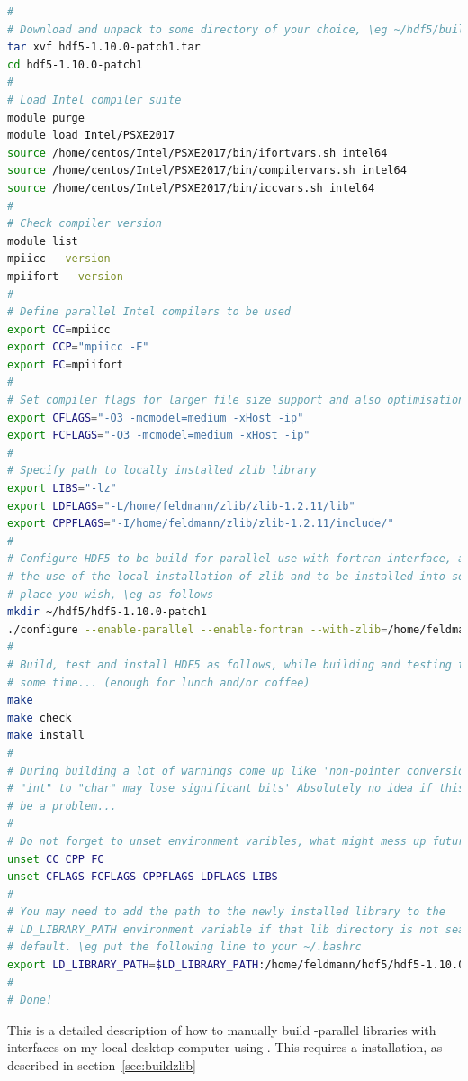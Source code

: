 \documentclass[a4paper, 11pt, DIV=11]{scrartcl}
\begin{document}
\begin{lstlisting}[language=bash]
# 
# Download and unpack to some directory of your choice, \eg ~/hdf5/build/.
tar xvf hdf5-1.10.0-patch1.tar 
cd hdf5-1.10.0-patch1
#
# Load Intel compiler suite
module purge
module load Intel/PSXE2017
source /home/centos/Intel/PSXE2017/bin/ifortvars.sh intel64
source /home/centos/Intel/PSXE2017/bin/compilervars.sh intel64
source /home/centos/Intel/PSXE2017/bin/iccvars.sh intel64
#
# Check compiler version
module list
mpiicc --version
mpiifort --version
#
# Define parallel Intel compilers to be used
export CC=mpiicc
export CCP="mpiicc -E"
export FC=mpiifort
#
# Set compiler flags for larger file size support and also optimisation level 3
export CFLAGS="-O3 -mcmodel=medium -xHost -ip"
export FCFLAGS="-O3 -mcmodel=medium -xHost -ip"
#
# Specify path to locally installed zlib library
export LIBS="-lz"
export LDFLAGS="-L/home/feldmann/zlib/zlib-1.2.11/lib"
export CPPFLAGS="-I/home/feldmann/zlib/zlib-1.2.11/include/"
#
# Configure HDF5 to be build for parallel use with fortran interface, as well as
# the use of the local installation of zlib and to be installed into some
# place you wish, \eg as follows
mkdir ~/hdf5/hdf5-1.10.0-patch1
./configure --enable-parallel --enable-fortran --with-zlib=/home/feldmann/zlib/zlib-1.2.11 --prefix=/home/feldmann/hdf5/hdf5-1.10.0-patch1
#
# Build, test and install HDF5 as follows, while building and testing take quite
# some time... (enough for lunch and/or coffee)
make
make check
make install
#
# During building a lot of warnings come up like 'non-pointer conversion from
# "int" to "char" may lose significant bits' Absolutely no idea if this might
# be a problem...
# 
# Do not forget to unset environment varibles, what might mess up future builds
unset CC CPP FC
unset CFLAGS FCFLAGS CPPFLAGS LDFLAGS LIBS
#
# You may need to add the path to the newly installed library to the
# LD_LIBRARY_PATH environment variable if that lib directory is not searched by
# default. \eg put the following line to your ~/.bashrc
export LD_LIBRARY_PATH=$LD_LIBRARY_PATH:/home/feldmann/hdf5/hdf5-1.10.0-patch1/lib
# 
# Done!
\end{lstlisting}

This is a detailed description of how to manually build \mpi-parallel \hdf
libraries with \fortran interfaces on my local desktop computer using
. This requires a  installation, as described in
section~\ref{sec:buildzlib}
\end{document}
